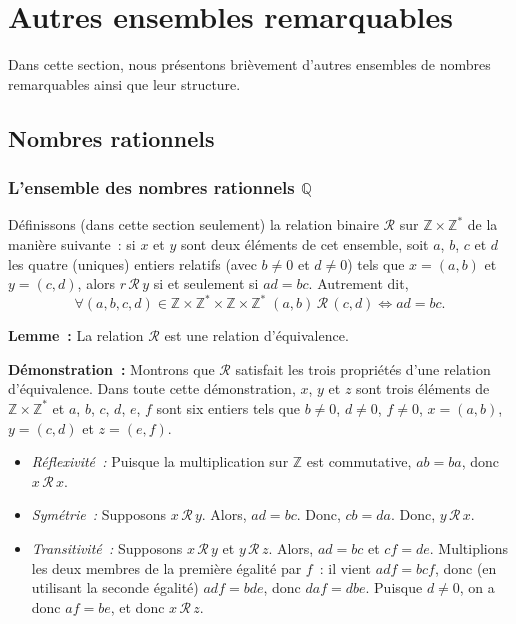 \section{Autres ensembles remarquables}

\localtoc

\noindent Dans cette section, nous présentons brièvement d'autres ensembles de nombres remarquables ainsi que leur structure.

\subsection{Nombres rationnels}

\subsubsection{L'ensemble des nombres rationnels \texorpdfstring{$\mathbb{Q}$}{Q}}

Définissons (dans cette section seulement) la relation binaire $\mathcal{R}$ sur $\mathbb{Z} \times \mathbb{Z}^*$ de la manière suivante : si $x$ et $y$ sont deux éléments de cet ensemble, soit $a$, $b$, $c$ et $d$ les quatre (uniques) entiers relatifs (avec $b \neq 0$ et $d \neq 0$) tels que $x = (a, b)$ et $y = (c, d)$, alors $r \, \mathcal{R} \, y$ si et seulement si $a d = b c$. 
Autrement dit, 
\begin{equation*}
    \forall (a, b, c, d) \in \mathbb{Z} \times \mathbb{Z}^* \times \mathbb{Z} \times \mathbb{Z}^* \;
    (a, b) \, \mathcal{R} \, (c, d)
    \Leftrightarrow a d = b c .
\end{equation*}

\medskip

\noindent\textbf{Lemme :} La relation $\mathcal{R}$ est une relation d'équivalence. 

\medskip

\noindent\textbf{Démonstration :} Montrons que $\mathcal{R}$ satisfait les trois propriétés d'une relation d'équivalence.
    Dans toute cette démonstration, $x$, $y$ et $z$ sont trois éléments de $\mathbb{Z} \times \mathbb{Z}^*$ et $a$, $b$, $c$, $d$, $e$, $f$ sont six entiers tels que $b \neq 0$, $d \neq 0$, $f \neq 0$, $x = (a, b)$, $y = (c, d)$ et $z = (e, f)$.
    \begin{itemize}[nosep]
        \item \textit{Réflexivité :} Puisque la multiplication sur $\mathbb{Z}$ est commutative, $a b = b a$, donc $x \, \mathcal{R} \, x$.
        \item \textit{Symétrie :} Supposons $x \, \mathcal{R} \, y$. 
            Alors, $a d = b c$.
            Donc, $c b = d a$.
            Donc, $y \, \mathcal{R} \, x$.
        \item \textit{Transitivité :} Supposons $x \, \mathcal{R} \, y$ et $y \, \mathcal{R} \, z$.
            Alors, $a d = b c$ et $c f = d e$.
            Multiplions les deux membres de la première égalité par $f$ : il vient $a d f = b c f$, donc (en utilisant la seconde égalité) $a d f = b d e$, donc $d a f = d b e$.
            Puisque $d \neq 0$, on a donc $a f = b e$, et donc $x \, \mathcal{R} \, z$.
    \end{itemize}
    
